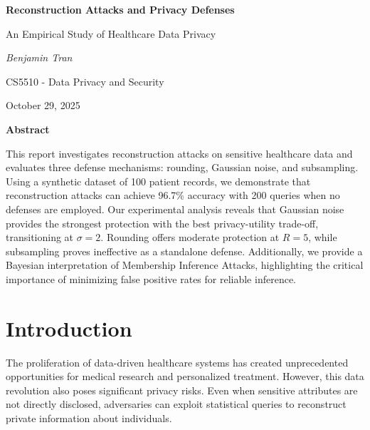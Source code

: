 \documentclass[11pt,letterpaper]{article}
\begin{document}
\begin{titlepage}
    \centering
    \vspace*{2cm}
    
    {\Huge\bfseries Reconstruction Attacks and Privacy Defenses\par}
    \vspace{0.5cm}
    {\Large An Empirical Study of Healthcare Data Privacy\par}
    \vspace{2cm}
    
    {\Large\itshape Benjamin Tran\par}
    \vspace{1cm}
    
    {\large CS5510 - Data Privacy and Security\par}
    \vspace{0.5cm}
    {\large October 29, 2025\par}
    
    \vfill
    
    {\large \textbf{Abstract}\par}
    \vspace{0.5cm}
    \begin{minipage}{0.8\textwidth}
        \small
        This report investigates reconstruction attacks on sensitive healthcare data and evaluates three defense mechanisms: rounding, Gaussian noise, and subsampling. Using a synthetic dataset of 100 patient records, we demonstrate that reconstruction attacks can achieve 96.7\% accuracy with 200 queries when no defenses are employed. Our experimental analysis reveals that Gaussian noise provides the strongest protection with the best privacy-utility trade-off, transitioning at $\sigma = 2$. Rounding offers moderate protection at $R = 5$, while subsampling proves ineffective as a standalone defense. Additionally, we provide a Bayesian interpretation of Membership Inference Attacks, highlighting the critical importance of minimizing false positive rates for reliable inference.
    \end{minipage}
    
    \vfill
\end{titlepage}

\tableofcontents
\newpage

\section{Introduction}

The proliferation of data-driven healthcare systems has created unprecedented opportunities for medical research and personalized treatment. However, this data revolution also poses significant privacy risks. Even when sensitive attributes are not directly disclosed, adversaries can exploit statistical queries to reconstruct private information about individuals.
\end{document}
